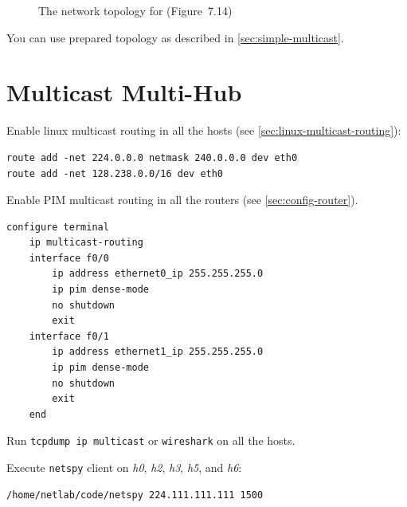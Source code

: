 \documentclass{../UTNetLab}
\begin{document}
\begin{figure}[H]
        \caption{The network topology for  (Figure~7.14)}
        \label{fig:7.14}
    \end{figure}

    You can use prepared topology as described in \autoref{sec:simple-multicast}.

\section{Multicast Multi-Hub\label{sec:multi-hub}}
    Enable linux multicast routing in all the hosts (see \autoref{sec:linux-multicast-routing}):
    \begin{lstlisting}[emph={eth0}]
route add -net 224.0.0.0 netmask 240.0.0.0 dev eth0
route add -net 128.238.0.0/16 dev eth0
    \end{lstlisting}

    Enable PIM multicast routing in all the routers (see \autoref{sec:config-router}). 
    \begin{lstlisting}[language={cisco}, emph={ethernet0_ip, ethernet1_ip}]
configure terminal
    ip multicast-routing
    interface f0/0
        ip address ethernet0_ip 255.255.255.0
        ip pim dense-mode
        no shutdown
        exit
    interface f0/1
        ip address ethernet1_ip 255.255.255.0
        ip pim dense-mode
        no shutdown
        exit
    end
    \end{lstlisting}

    Run \lstinline{tcpdump ip multicast} or \lstinline{wireshark} on all the hosts. 

    Execute \lstinline{netspy} client on \textit{h0}, \textit{h2}, \textit{h3}, \textit{h5}, and \textit{h6}:
    \begin{lstlisting}
/home/netlab/code/netspy 224.111.111.111 1500
    \end{lstlisting}
\end{document}
